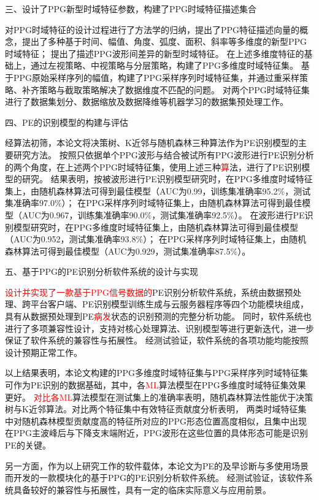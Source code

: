 三、设计了PPG新型时域特征参数，构建了PPG时域特征描述集合

对PPG时域特征的设计过程进行了方法学的归纳，提出了PPG特征描述向量的概念，提出了多种基于时间、幅值、角度、弧度、面积、斜率等多维度的新型PPG时域特征；
提出了描述PPG波形间差异的新型时域特征。
在上述多维度特征的基础上，通过左视策略、中视策略与分层策略，构建了PPG多维度时域特征集。
基于PPG原始采样序列的幅值，构建了PPG采样序列时域特征集，并通过重采样策略、补齐策略与截取策略解决了数据维度不匹配的问题。
对两个PPG时域特征集进行了数据集划分、数据缩放及数据降维等机器学习的数据集预处理工作。

四、PE的识别模型的构建与评估

经算法初筛，本论文将决策树、K近邻与随机森林三种算法作为PE识别模型的主要研究方法。
按照只依据单个PPG波形与结合被试所有PPG波形进行PE识别分析的两个角度，在上述两个PPG时域特征集，使用上述三种\textcolor{red}{算}法，进行了PE识别模型的研究。
结果表明，按被波形进行PE识别模型研究时，在PPG多维度时域特征集上，由随机森林算法可得到最佳模型（AUC为0.99，训练集准确率95.2\%，测试集准确率97.0\%）；
在PPG采样序列时域特征集上，由随机森林算法可得到最佳模型（AUC为0.967，训练集准确率90.0\%，测试集准确率92.5\%）。
在波形进行PE识别模型研究时，在PPG多维度时域特征集上，由随机森林算法可得到最佳模型（AUC为0.952，测试集准确率93.8\%）；
在PPG采样序列时域特征集上，由随机森林算法可得到最佳模型（AUC为0.929，测试集准确率87.5\%）。

五、基于PPG的PE识别分析软件系统的设计与实现

\textcolor{red}{设计并实现了一款基于PPG信号数据的}PE识别分析软件系统，系统由数据预处理、跨平台客户端、PE识别模型训练生成与云服务器程序等四个功能模块组成，
具有从数据预处理到PE\textcolor{red}{病发}状态的识别预测的完整分析功能。
同时，软件系统也进行了多项兼容性设计，支持对核心处理算法、识别模型等进行更新迭代，进一步保证了软件系统的兼容性与拓展性。
经测试验证，软件系统的各项功能均能按照设计预期正常工作。

以上结果表明，本论文构建的PPG多维度时域特征集与PPG采样序列时域特征集可作为PE识别的数据基础，其中，各\textcolor{red}{ML}算法模型在PPG多维度时域特征集效果更好。
\textcolor{red}{对比各ML}算法模型在测试集上的准确率表明，随机森林算法性能优于决策树与K近邻算法。对比两个特征集中有效特征贡献度分析表明，
两类时域特征集中对随机森林模型贡献度高的特征所对应的PPG形态位置高度相似，且集中出现在PPG主波峰后与下降支末端附近，PPG波形在这些位置的具体形态可能是识别PE的关键。

另一方面，作为以上研究工作的软件载体，本论文为PE的及早诊断与多使用场景而开发的一款模块化的基于PPG的PE识别分析软件系统。
经测试验证，该软件系统具备较好的兼容性与拓展性，具有一定的临床实际意义与应用前景。
